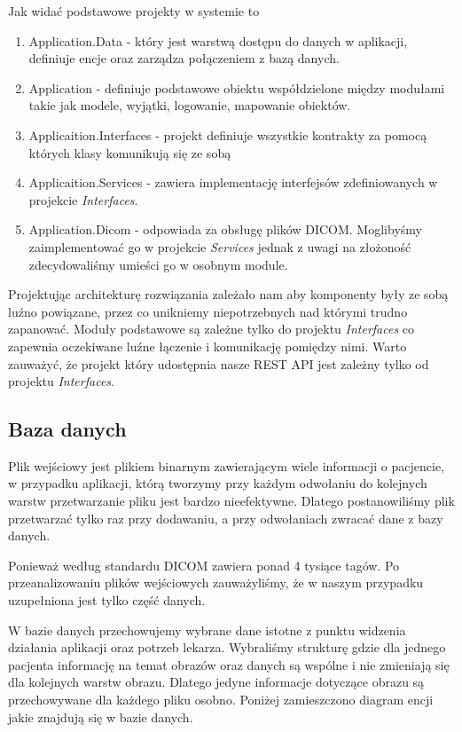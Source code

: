 \documentclass[a4paper,11pt,twoside]{report}
\theoremstyle{definition}
\begin{document}
Jak widać podstawowe projekty w systemie to
\begin{enumerate}
\item Application.Data - który jest warstwą dostępu do danych w aplikacji, definiuje encje oraz zarządza połączeniem z bazą danych.
\item Application - definiuje podstawowe obiektu współdzielone między modułami takie jak modele, wyjątki, logowanie, mapowanie obiektów.
\item Applicaition.Interfaces - projekt definiuje wszystkie kontrakty za pomocą których klasy komunikują się ze sobą
\item Applicaition.Services - zawiera implementację interfejsów zdefiniowanych w projekcie \textit{Interfaces}.
\item Application.Dicom - odpowiada za obsługę plików DICOM. Moglibyśmy zaimplementować go w projekcie \textit{Services} jednak z uwagi na złożoność zdecydowaliśmy umieści go w osobnym module.
\end{enumerate}

Projektując architekturę rozwiązania zależało nam aby komponenty były ze sobą luźno powiązane, przez co unikniemy niepotrzebnych nad którymi trudno zapanować. Moduły podstawowe są zależne tylko do projektu \textit{Interfaces} co zapewnia oczekiwane luźne łączenie i komunikację pomiędzy nimi. Warto zauważyć, że projekt który udostępnia nasze REST API jest zależny tylko od projektu \textit{Interfaces}.

\subsection{Baza danych}

Plik wejściowy jest plikiem binarnym zawierającym wiele informacji o pacjencie, w przypadku aplikacji, którą tworzymy przy każdym odwołaniu do kolejnych warstw przetwarzanie pliku jest bardzo nieefektywne. Dlatego postanowiliśmy plik przetwarzać tylko raz przy dodawaniu, a przy odwołaniach zwracać dane z bazy danych.
\par
Ponieważ według standardu DICOM \cite{standardDICOM} zawiera ponad 4 tysiące tagów. Po przeanalizowaniu plików wejściowych zauważyliśmy, że w naszym przypadku uzupełniona jest tylko część danych. 
\par
W bazie danych przechowujemy wybrane dane istotne z punktu widzenia działania aplikacji oraz potrzeb lekarza. Wybraliśmy strukturę gdzie dla jednego pacjenta informację na temat obrazów oraz danych są wspólne i nie zmieniają się dla kolejnych warstw obrazu. Dlatego jedyne informacje dotyczące obrazu są przechowywane dla każdego pliku osobno. Poniżej zamieszczono diagram encji jakie znajdują się w bazie danych.
\end{document}
